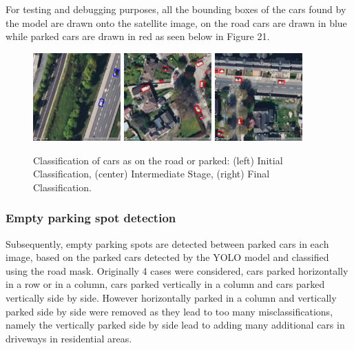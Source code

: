 For testing and debugging purposes, all the bounding boxes of the cars found by
the model are drawn onto the satellite image, on the road cars are drawn in blue
while parked cars are drawn in red as seen below in
Figure 21.

\begin{figure}[htbp]
  \centering
  \includegraphics[width=0.30\textwidth]{images/road_mask_classification1.png}
  \hfill
  \includegraphics[width=0.30\textwidth]{images/road_mask_classification2.png}
  \hfill
  \includegraphics[width=0.30\textwidth]{images/road_mask_classification3.png}
  \caption{Classification of cars as on the road or parked: (left) Initial Classification, (center) Intermediate Stage, (right) Final Classification.}
  \label{fig:road_mask_classification}
\end{figure}


\newpage

\subsubsection{Empty parking spot detection}
Subsequently, empty parking spots are detected between parked cars in each
image, based on the parked cars detected by the YOLO model and classified using
the road mask. Originally 4 cases were considered, cars parked horizontally in a
row or in a column, cars parked vertically in a column and cars parked
vertically side by side. However horizontally parked in a column and vertically
parked side by side were removed as they lead to too many misclassifications,
namely the vertically parked side by side lead to adding many additional cars in
driveways in residential areas.

